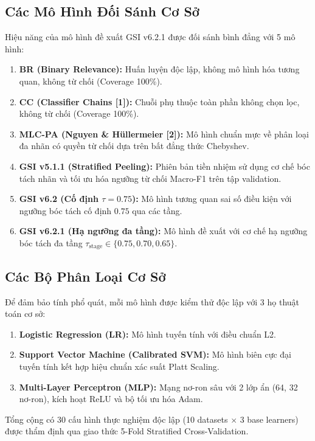 \documentclass[10pt,a4paper,twoside]{article}
\begin{document}
\subsection{Các Mô Hình Đối Sánh Cơ Sở}
Hiệu năng của mô hình đề xuất GSI v6.2.1 được đối sánh bình đẳng với 5 mô hình:
\begin{enumerate}[leftmargin=*]
    \item \textbf{BR (Binary Relevance):} Huấn luyện độc lập, không mô hình hóa tương quan, không từ chối (Coverage 100\%).
    \item \textbf{CC (Classifier Chains [1]):} Chuỗi phụ thuộc toàn phần không chọn lọc, không từ chối (Coverage 100\%).
    \item \textbf{MLC-PA (Nguyen \& Hüllermeier [2]):} Mô hình chuẩn mực về phân loại đa nhãn có quyền từ chối dựa trên bất đẳng thức Chebyshev.
    \item \textbf{GSI v5.1.1 (Stratified Peeling):} Phiên bản tiền nhiệm sử dụng cơ chế bóc tách nhãn và tối ưu hóa ngưỡng từ chối Macro-F1 trên tập validation.
    \item \textbf{GSI v6.2 (Cố định $\tau=0.75$):} Mô hình tương quan sai số điều kiện với ngưỡng bóc tách cố định $0.75$ qua các tầng.
    \item \textbf{GSI v6.2.1 (Hạ ngưỡng đa tầng):} Mô hình đề xuất với cơ chế hạ ngưỡng bóc tách đa tầng $\tau_{\text{stage}} \in \{0.75, 0.70, 0.65\}$.
\end{enumerate}

\subsection{Các Bộ Phân Loại Cơ Sở}
Để đảm bảo tính phổ quát, mỗi mô hình được kiểm thử độc lập với 3 họ thuật toán cơ sở:
\begin{enumerate}[leftmargin=*]
    \item \textbf{Logistic Regression (LR):} Mô hình tuyến tính với điều chuẩn L2.
    \item \textbf{Support Vector Machine (Calibrated SVM):} Mô hình biên cực đại tuyến tính kết hợp hiệu chuẩn xác suất Platt Scaling.
    \item \textbf{Multi-Layer Perceptron (MLP):} Mạng nơ-ron sâu với 2 lớp ẩn (64, 32 nơ-ron), kích hoạt ReLU và bộ tối ưu hóa Adam.
\end{enumerate}
Tổng cộng có 30 cấu hình thực nghiệm độc lập (10 datasets $\times$ 3 base learners) được thẩm định qua giao thức 5-Fold Stratified Cross-Validation.
\end{document}
